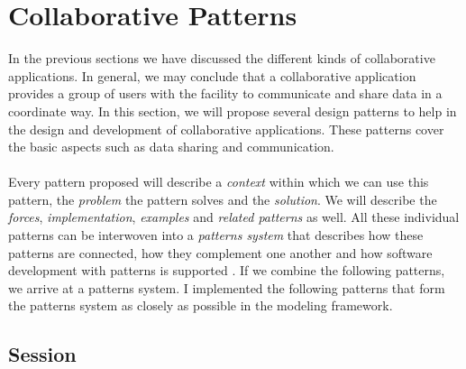 



\section{Collaborative Patterns}

In the previous sections we have discussed the different kinds of collaborative applications. In general, we may conclude that a collaborative application provides a group of users with the facility to communicate and share data in a coordinate way. In this section, we will propose several design patterns to help in the design and development of collaborative applications. These patterns cover the basic aspects such as data sharing and communication.
\\ \\
Every pattern proposed will describe a \textit{context} within which we can use this pattern, the \textit{problem} the pattern solves and the \textit{solution}. We will describe the \textit{forces}, \textit{implementation}, \textit{examples} and \textit{related patterns} as well. All these individual patterns can be interwoven into a \textit{patterns system} that describes how these patterns are connected, how they complement one another and how software development with patterns is supported \cite{DesignPatternsColl}. If we combine the following patterns, we arrive at a patterns system. I implemented the following patterns that form the patterns system as closely as possible in the modeling framework.

\subsection{Session}

